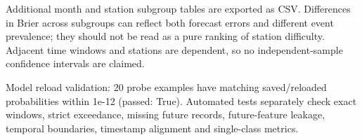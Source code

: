 \documentclass[11pt,a4paper]{article}
\begin{document}
\begin{table}[H]\centering\small
\caption{Test subgroup probability performance}
\end{table}
\begin{table}[H]\centering\small
\caption{Test subgroup probability performance}
\end{table}
Additional month and station subgroup tables are exported as CSV. Differences in Brier across subgroups can reflect both forecast errors and different event prevalence; they should not be read as a pure ranking of station difficulty. Adjacent time windows and stations are dependent, so no independent-sample confidence intervals are claimed.

Model reload validation: 20 probe examples have matching saved/reloaded probabilities within 1e-12 (passed: True). Automated tests separately check exact windows, strict exceedance, missing future records, future-feature leakage, temporal boundaries, timestamp alignment and single-class metrics.
\end{document}

